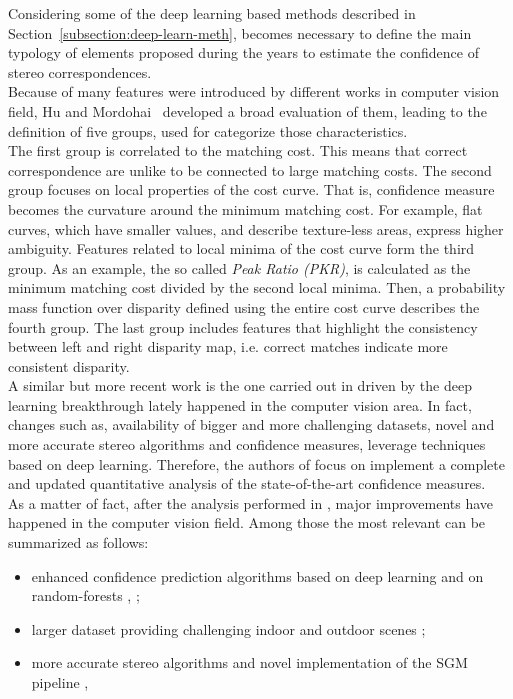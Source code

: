 Considering some of the deep learning based methods described in Section~\ref{subsection:deep-learn-meth}, becomes necessary to define the main typology of elements proposed during the years to estimate the confidence of stereo correspondences. \\
Because of many features were introduced by different works in computer vision field, Hu and Mordohai~\cite{Hu2012} developed a broad evaluation of them, leading to the definition of five groups, used for categorize those characteristics. \\
The first group is correlated to the matching cost. 
This means that correct correspondence are unlike to be connected to large matching costs. 
The second group focuses on local properties of the cost curve. 
That is, confidence measure becomes the curvature around the minimum matching cost. 
For example, flat curves, which have smaller values, and describe texture-less areas, express higher ambiguity.
Features related to local minima of the cost curve form the third group. 
As an example, the so called \textit{Peak Ratio (PKR)}, is calculated as the minimum matching cost divided by the second local minima.
Then, a probability mass function over disparity defined using the entire cost curve describes the fourth group.
The last group includes features that highlight the consistency between left and right disparity map, i.e. correct matches indicate more consistent disparity.\\
A similar but more recent work is the one carried out in \cite{Poggi2017} driven by the deep learning breakthrough lately happened in the computer vision area. 
In fact, changes such as, availability of bigger and more challenging datasets, novel and more accurate stereo algorithms and confidence measures, leverage techniques based on deep learning.
Therefore, the authors of \cite{Poggi2017} focus on implement a complete and updated quantitative analysis of the state-of-the-art confidence measures.\\
As a matter of fact, after the analysis performed in \cite{Hu2012}, major improvements have happened in the computer vision field.
Among those the most relevant can be summarized as follows:
\begin{itemize}
	\item enhanced confidence prediction algorithms based on deep learning \cite{poggi2016learning} and on random-forests \cite{Spyropoulos2014}, \cite{Park2015};
	\item larger dataset providing challenging indoor and outdoor scenes \cite{Mayer2016};
	\item more accurate stereo algorithms and novel implementation of the SGM pipeline \cite{Seki2016}, \cite{Zbontar2016}
\end{itemize}

